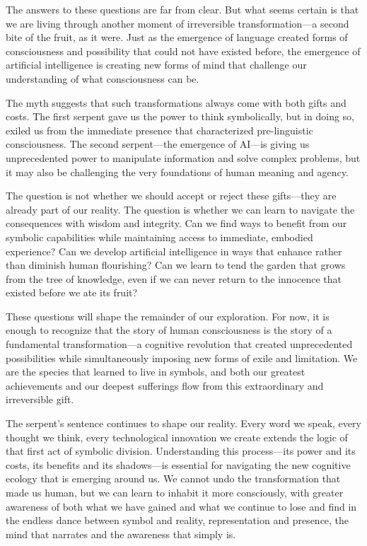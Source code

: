 The answers to these questions are far from clear. But what seems certain is that we are living through another moment of irreversible transformation—a second bite of the fruit, as it were. Just as the emergence of language created forms of consciousness and possibility that could not have existed before, the emergence of artificial intelligence is creating new forms of mind that challenge our understanding of what consciousness can be.

The myth suggests that such transformations always come with both gifts and costs. The first serpent gave us the power to think symbolically, but in doing so, exiled us from the immediate presence that characterized pre-linguistic consciousness. The second serpent—the emergence of AI—is giving us unprecedented power to manipulate information and solve complex problems, but it may also be challenging the very foundations of human meaning and agency.

The question is not whether we should accept or reject these gifts—they are already part of our reality. The question is whether we can learn to navigate the consequences with wisdom and integrity. Can we find ways to benefit from our symbolic capabilities while maintaining access to immediate, embodied experience? Can we develop artificial intelligence in ways that enhance rather than diminish human flourishing? Can we learn to tend the garden that grows from the tree of knowledge, even if we can never return to the innocence that existed before we ate its fruit?

These questions will shape the remainder of our exploration. For now, it is enough to recognize that the story of human consciousness is the story of a fundamental transformation—a cognitive revolution that created unprecedented possibilities while simultaneously imposing new forms of exile and limitation. We are the species that learned to live in symbols, and both our greatest achievements and our deepest sufferings flow from this extraordinary and irreversible gift.

The serpent's sentence continues to shape our reality. Every word we speak, every thought we think, every technological innovation we create extends the logic of that first act of symbolic division. Understanding this process—its power and its costs, its benefits and its shadows—is essential for navigating the new cognitive ecology that is emerging around us. We cannot undo the transformation that made us human, but we can learn to inhabit it more consciously, with greater awareness of both what we have gained and what we continue to lose and find in the endless dance between symbol and reality, representation and presence, the mind that narrates and the awareness that simply is.

